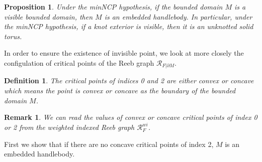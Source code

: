 \documentclass{amsart}
\newtheorem{proposition}[theorem]{Proposition}
\newtheorem{definition}[theorem]{Definition}
\newtheorem{remark}[theorem]{Remark}
\numberwithin{equation}{section}
\newcommand{\bd}{\partial}
\begin{document}
\begin{proposition}\label{prop:not_handlebody_not_visible}
Under the minNCP hypothesis,
if the bounded domain $M$ is a visible bounded domain, 
then $M$ is an embedded handlebody. In particular, under the minNCP hypothesis,
if a knot exterior is visible, then it is an unknotted solid torus.
\end{proposition} 

In order to ensure the existence of invisible point, we look at more closely the configulation of critical points of the Reeb graph $\mathcal{R}_{F|\bd M}$.

\begin{definition}
The critical points of indices 0 and 2 are either convex or concave which means the point is convex or concave as the boundary of the bounded domain $M$.  
\end{definition}

\begin{remark}
We can read the values of convex or concave critical points of index 0 or 2 from the weighted indexed Reeb graph $\mathcal{R}_F^{wi}$. 
\end{remark}


First we show that if there are no concave critical points of index 2, $M$ is an embedded handlebody.
\end{document}
